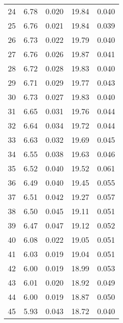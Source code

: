 \begin{table}
\begin{tabular}{c|ll|ll}
24 & 6.78 & 0.020 & 19.84 & 0.040 \\
25 & 6.76 & 0.021 & 19.84 & 0.039 \\
26 & 6.73 & 0.022 & 19.79 & 0.040 \\
27 & 6.76 & 0.026 & 19.87 & 0.041 \\
28 & 6.72 & 0.028 & 19.83 & 0.040 \\
29 & 6.71 & 0.029 & 19.77 & 0.043 \\
30 & 6.73 & 0.027 & 19.83 & 0.040 \\
31 & 6.65 & 0.031 & 19.76 & 0.044 \\
32 & 6.64 & 0.034 & 19.72 & 0.044 \\
33 & 6.63 & 0.032 & 19.69 & 0.045 \\
34 & 6.55 & 0.038 & 19.63 & 0.046 \\
35 & 6.52 & 0.040 & 19.52 & 0.061 \\
36 & 6.49 & 0.040 & 19.45 & 0.055 \\
37 & 6.51 & 0.042 & 19.27 & 0.057 \\
38 & 6.50 & 0.045 & 19.11 & 0.051 \\
39 & 6.47 & 0.047 & 19.12 & 0.052 \\
40 & 6.08 & 0.022 & 19.05 & 0.051 \\
41 & 6.03 & 0.019 & 19.04 & 0.051 \\
42 & 6.00 & 0.019 & 18.99 & 0.053 \\
43 & 6.01 & 0.020 & 18.92 & 0.049 \\
44 & 6.00 & 0.019 & 18.87 & 0.050 \\
45 & 5.93 & 0.043 & 18.72 & 0.040 \\
               \hline
        \end{tabular}
    \end{table}
    \clearpage

